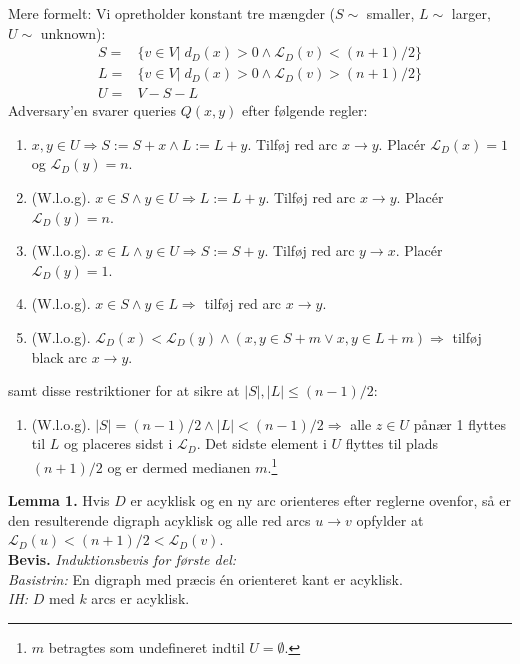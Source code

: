 Mere formelt: Vi opretholder konstant tre mængder ($S \sim$ smaller, $L \sim$ larger, $U \sim$ unknown): 
\begin{align*}
S =& \{v \in V| \; d_D(x)>0 \wedge\mathcal{L}_D(v)<(n+1)/2\} \\
L =& \{v \in V| \; d_D(x)>0 \wedge\mathcal{L}_D(v)>(n+1)/2\} \\
U =& V-S-L
\end{align*}
Adversary'en svarer queries $Q(x,y)$ efter følgende regler: 
\begin{enumerate}
	\item $x,y \in U \Longrightarrow S := S+x \wedge L := L+y$. Tilføj red arc $x \rightarrow y$. Placér $\mathcal{L}_D(x)=1$ og $\mathcal{L}_D(y)=n$. 
	\item (W.l.o.g). $x \in S \wedge y \in U \Longrightarrow L := L+y$. Tilføj red arc $x \rightarrow y$. Placér $\mathcal{L}_D(y)=n$.
	\item (W.l.o.g). $x \in L \wedge y \in U \Longrightarrow S := S+y$. Tilføj red arc $y \rightarrow x$. Placér $\mathcal{L}_D(y)=1$.
	\item (W.l.o.g). $x \in S \wedge y \in L \Longrightarrow$ tilføj red arc $x \rightarrow y$. 
	\item (W.l.o.g). $\mathcal{L}_D(x)<\mathcal{L}_D(y) \wedge(x,y \in S+m \vee x,y \in L+m) \Longrightarrow$ tilføj black arc $x \rightarrow y$. 
\end{enumerate}
samt disse restriktioner for at sikre at $|S|,|L|\le (n-1)/2$:
\begin{enumerate}
	\item (W.l.o.g). $|S|=(n-1)/2 \wedge |L|<(n-1)/2 \Longrightarrow$ alle $z \in U$ pånær 1 flyttes til $L$ og placeres sidst i $\mathcal{L}_D$. Det sidste element i $U$ flyttes til plads $(n+1)/2$ og er dermed medianen $m$.\footnote{$m$ betragtes som undefineret indtil $U = \emptyset$.}  
\end{enumerate}
\textbf{Lemma 1.} Hvis $D$ er acyklisk og en ny arc orienteres efter reglerne ovenfor, så er den resulterende digraph acyklisk og alle red arcs $u \rightarrow v$ opfylder at $\mathcal{L}_D(u)<(n+1)/2<\mathcal{L}_D(v)$. \\

\textbf{Bevis.} \textit{Induktionsbevis for første del:}\\

\textit{Basistrin:} En digraph med præcis én orienteret kant er acyklisk. \\ 

\textit{IH:} $D$ med $k$ arcs er acyklisk.\\

